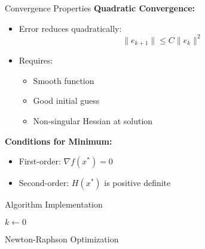 \documentclass[10pt]{beamer}
\theoremstyle{plain}%
\theoremstyle{definition}
\theoremstyle{remark}
\begin{document}
\begin{frame}{Convergence Properties}
    \textbf{Quadratic Convergence:}
    \begin{itemize}
        \item Error reduces quadratically:
        \[ \|e_{k+1}\| \leq C\|e_k\|^2 \]
        \item Requires:
        \begin{itemize}
            \item Smooth function
            \item Good initial guess
            \item Non-singular Hessian at solution
        \end{itemize}
    \end{itemize}
    
    \textbf{Conditions for Minimum:}
    \begin{itemize}
        \item First-order: $\nabla f(x^*) = 0$
        \item Second-order: $H(x^*)$ is positive definite
    \end{itemize}
\end{frame}

\begin{frame}[fragile]{Algorithm Implementation}
    \begin{algorithm2e}[H]
    \SetAlgoLined
    
    $k \leftarrow 0$\;
    \caption{Newton-Raphson Optimization}
    \end{algorithm2e}
\end{frame}
\end{document}
